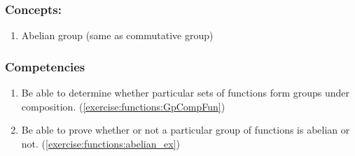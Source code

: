 \subsubsection*{Concepts:}
\begin{enumerate}
\item 
Abelian group (same as commutative group)
\end{enumerate}

\subsubsection*{Competencies}
\begin{enumerate}
\item
Be able to determine whether particular sets of functions form groups under composition. (\ref{exercise:functions:GpCompFun})
\item
Be able to prove whether or not a particular group of functions is abelian or not. (\ref{exercise:functions:abelian_ex})
\end{enumerate}
